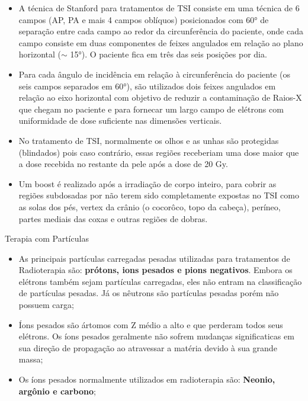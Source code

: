 \documentclass[11pt,a4paper]{article}
\newcounter{exemplo}
\begin{document}
\begin{exemplo}
\begin{itemize}
        \item A técnica de Stanford para tratamentos de TSI consiste em uma técnica de 6 campos (AP, PA e mais 4 campos oblíquos) posicionados com \ang{60} de separação entre cada campo ao redor da circunferência do paciente, onde cada campo consiste em duas componentes de feixes angulados em relação ao plano horizontal ($\sim$ \ang{15}). O paciente fica em três das seis posições por dia.
        
        \item Para cada ângulo de incidência em relação à circunferência do paciente (os seis campos separados em \ang{60}), são utilizados dois feixes angulados em relação ao eixo horizontal com objetivo de reduzir a contaminação de Raios-X que chegam no paciente e para fornecar um largo campo de elétrons com uniformidade de dose suficiente nas dimensões verticais.
        
        \item No tratamento de TSI, normalmente os olhos e as unhas são protegidas (blindados) pois caso contrário, essas regiões receberiam uma dose maior que a dose recebida no restante da pele após a dose de 20 Gy.
        
        \item Um boost é realizado após a irradiação de corpo inteiro, para cobrir as regiões subdosadas por não terem sido completamente expostas no TSI como as solas dos pés, vertex da crânio (o cocorôco, topo da cabeça), períneo, partes mediais das coxas e outras regiões de dobras. 

    \end{itemize}

    \textcolor{CarnationPink}{Terapia com Partículas} 
    \begin{itemize}
        \item As principais partículas carregadas pesadas utilizadas para tratamentos de Radioterapia são: \textbf{prótons, ions pesados e pions negativos}. Embora os elétrons também sejam partículas carregadas, eles não entram na classificação de partículas pesadas.  Já os nêutrons são partículas pesadas porém não possuem carga;
        
        \item Íons pesados são ártomos com Z médio a alto e que perderam todos seus elétrons. Os íons pesados geralmente não sofrem mudanças significaticas em sua direção de propagação ao atravessar a matéria devido à sua grande massa;
        
        \item Os íons pesados normalmente utilizados em radioterapia são: \textbf{Neonio, argônio e carbono};
        

\end{itemize}
\end{exemplo}
\end{document}

